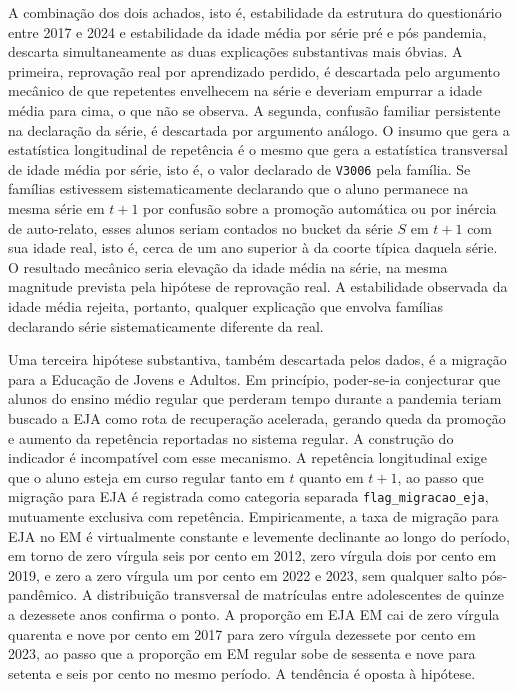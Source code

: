 A combinação dos dois achados, isto é, estabilidade da
estrutura do questionário entre 2017 e 2024 e estabilidade
da idade média por série pré e pós pandemia, descarta
simultaneamente as duas explicações substantivas mais
óbvias. A primeira, reprovação real por aprendizado
perdido, é descartada pelo argumento mecânico de que
repetentes envelhecem na série e deveriam empurrar a idade
média para cima, o que não se observa. A segunda, confusão
familiar persistente na declaração da série, é descartada
por argumento análogo. O insumo que gera a estatística
longitudinal de repetência é o mesmo que gera a estatística
transversal de idade média por série, isto é, o valor
declarado de \texttt{V3006} pela família. Se famílias
estivessem sistematicamente declarando que o aluno
permanece na mesma série em $t+1$ por confusão sobre a
promoção automática ou por inércia de auto-relato, esses
alunos seriam contados no bucket da série $S$ em $t+1$ com
sua idade real, isto é, cerca de um ano superior à da
coorte típica daquela série. O resultado mecânico seria
elevação da idade média na série, na mesma magnitude
prevista pela hipótese de reprovação real. A estabilidade
observada da idade média rejeita, portanto, qualquer
explicação que envolva famílias declarando série
sistematicamente diferente da real.

Uma terceira hipótese substantiva, também descartada pelos
dados, é a migração para a Educação de Jovens e Adultos. Em
princípio, poder-se-ia conjecturar que alunos do ensino
médio regular que perderam tempo durante a pandemia teriam
buscado a EJA como rota de recuperação acelerada, gerando
queda da promoção e aumento da repetência reportadas no
sistema regular. A construção do indicador é incompatível
com esse mecanismo. A repetência longitudinal exige que o
aluno esteja em curso regular tanto em $t$ quanto em $t+1$,
ao passo que migração para EJA é registrada como categoria
separada \texttt{flag\_migracao\_eja}, mutuamente exclusiva
com repetência. Empiricamente, a taxa de migração para EJA
no EM é virtualmente constante e levemente declinante ao
longo do período, em torno de zero vírgula seis por cento
em 2012, zero vírgula dois por cento em 2019, e zero a zero
vírgula um por cento em 2022 e 2023, sem qualquer salto
pós-pandêmico. A distribuição transversal de matrículas
entre adolescentes de quinze a dezessete anos confirma o
ponto. A proporção em EJA EM cai de zero vírgula quarenta e
nove por cento em 2017 para zero vírgula dezessete por
cento em 2023, ao passo que a proporção em EM regular sobe
de sessenta e nove para setenta e seis por cento no mesmo
período. A tendência é oposta à hipótese.

